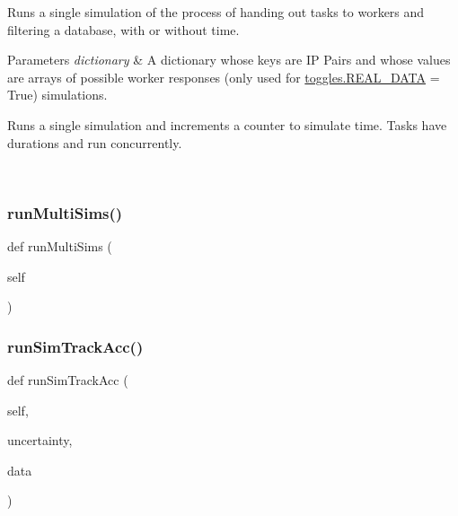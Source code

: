 Runs a single simulation of the process of handing out tasks to workers and filtering a database, with or without time. 


\begin{DoxyParams}{Parameters}
{\em dictionary} & A dictionary whose keys are IP Pairs and whose values are arrays of possible worker responses (only used for \mbox{\hyperlink{namespacedynamicfilterapp_1_1toggles_a00674fe8ef8f59b37d7fe239813bb627}{toggles.\+R\+E\+A\+L\+\_\+\+D\+A\+TA}} = True) simulations. \begin{DoxyVerb}Runs a single simulation and increments a counter to simulate time. Tasks
have durations and run concurrently.
\end{DoxyVerb}
 \\
\hline
\end{DoxyParams}
\mbox{\label{classdynamicfilterapp_1_1test__simulations_1_1_simulation_test_a126b1414201853740487c2f92fa2e8ee}} 
\subsubsection{\texorpdfstring{runMultiSims()}{runMultiSims()}}
{\footnotesize\ttfamily def run\+Multi\+Sims (\begin{DoxyParamCaption}\item[{}]{self }\end{DoxyParamCaption})}

\mbox{\label{classdynamicfilterapp_1_1test__simulations_1_1_simulation_test_a87a8325e13e3f2641a3371a9c72c9583}} 
\subsubsection{\texorpdfstring{runSimTrackAcc()}{runSimTrackAcc()}}
{\footnotesize\ttfamily def run\+Sim\+Track\+Acc (\begin{DoxyParamCaption}\item[{}]{self,  }\item[{}]{uncertainty,  }\item[{}]{data }\end{DoxyParamCaption})}



